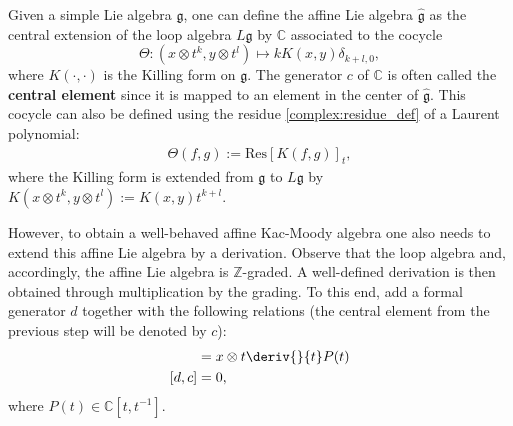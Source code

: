     \begin{definition}
        Given a simple Lie algebra $\mathfrak{g}$, one can define the affine Lie algebra $\widehat{\mathfrak{g}}$ as the central extension of the loop algebra $L\mathfrak{g}$ by $\mathbb{C}$ associated to the cocycle \[\Theta:(x\otimes t^k,y\otimes t^l)\mapsto kK(x,y)\delta_{k+l,0},\] where $K(\cdot,\cdot)$ is the Killing form on $\mathfrak{g}$. The generator $c$ of $\mathbb{C}$ is often called the \textbf{central element} since it is mapped to an element in the center of $\widehat{\mathfrak{g}}$. This cocycle can also be defined using the residue \ref{complex:residue_def} of a Laurent polynomial:
        \begin{gather}
            \Theta(f,g) := \mathrm{Res}\left[K(f,g)\right]_t,
        \end{gather}
        where the Killing form is extended from $\mathfrak{g}$ to $L\mathfrak{g}$ by $K(x\otimes t^k,y\otimes t^l):=K(x,y)t^{k+l}$.

        However, to obtain a well-behaved affine Kac-Moody algebra one also needs to extend this affine Lie algebra by a derivation. Observe that the loop algebra and, accordingly, the affine Lie algebra is $\mathbb{Z}$-graded. A well-defined derivation is then obtained through multiplication by the grading. To this end, add a formal generator $d$ together with the following relations (the central element from the previous step will be denoted by $c$):
        \begin{align}
            [d,x\otimes P(t)] &= x\otimes t\deriv{}{t}P(t)\\
            [d,c] &= 0,
        \end{align}
        where $P(t)\in\mathbb{C}[t,t^{-1}]$.
    \end{definition}


